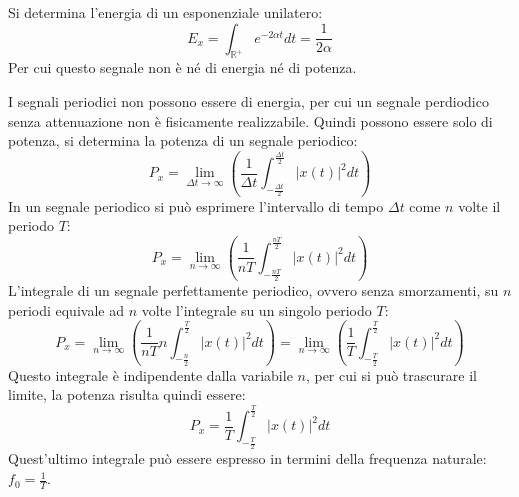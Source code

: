 \documentclass{article}
\numberwithin{equation}{subsection}
\begin{document}
Si determina l'energia di un esponenziale unilatero:
\begin{equation*}
    E_x=\displaystyle\int_{\mathbb{R}^+}e^{-2\alpha t}dt=\frac{1}{2\alpha}
\end{equation*}
Per cui questo segnale non è né di energia né di potenza. 


I segnali periodici non possono essere di energia, per cui un segnale perdiodico senza attenuazione non è fisicamente realizzabile. Quindi possono essere solo di potenza, 
si determina la potenza di un segnale periodico:
\begin{equation*}
    P_x=\lim_{\Delta t\to\infty}\displaystyle\left(\frac{1}{\Delta t}\int_{-\frac{\Delta t}{2}}^{\frac{\Delta t}{2}}|x(t)|^2dt\right)
\end{equation*}
In un segnale periodico si può esprimere l'intervallo di tempo $\Delta t$ come $n$ volte il periodo $T$:
\begin{equation*}
    P_x=\lim_{n\to\infty}\displaystyle\left(\frac{1}{n T}\int_{-\frac{nT}{2}}^{\frac{nT}{2}}|x(t)|^2dt\right)
\end{equation*}
L'integrale di un segnale perfettamente periodico, ovvero senza smorzamenti, su $n$ periodi equivale ad $n$ volte l'integrale su un singolo periodo $T$:
\begin{equation*}
    P_x=\lim_{n\to\infty}\displaystyle\left(\frac{1}{n T}n\int_{-\frac{n}{2}}^{\frac{T}{2}}|x(t)|^2dt\right)=\lim_{n\to\infty}\displaystyle\left(\frac{1}{T}\int_{-\frac{T}{2}}^{\frac{T}{2}}|x(t)|^2dt\right)
\end{equation*} 
Questo integrale è indipendente dalla variabile $n$, per cui si può trascurare il limite, la potenza risulta quindi essere:
\begin{equation}
    P_x=\displaystyle\frac{1}{T}\int_{-\frac{T}{2}}^{\frac{T}{2}}|x(t)|^2dt
\end{equation}
Quest'ultimo integrale può essere espresso in termini della frequenza naturale: $f_0=\frac{1}{T}$. 
\end{document}
